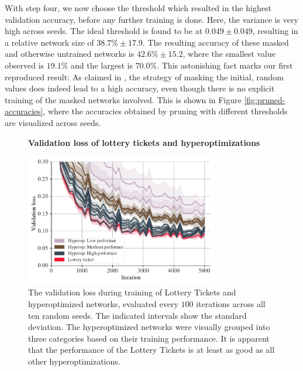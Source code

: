 \documentclass[12pt,final,twoside]{article}
\theoremstyle{plain}
\theoremstyle{definition}
\theoremstyle{remark}
\theoremstyle{named}
\begin{document}
With step four, we now choose the threshold which resulted in the highest validation accuracy, before any further training is done. Here, the variance is very high across seeds. The ideal threshold is found to be at $0.049 \pm 0.049$, resulting in a relative network size of $38.7\% \pm 17.9$. The resulting accuracy of these masked and otherwise untrained networks is $42.6\% \pm 15.2$, where the smallest value observed is $19.1\%$ and the largest is $70.0\%$. This astonishing fact marks our first reproduced result: As claimed in \cite{supermask}, the strategy of masking the initial, random values does indeed lead to a high accuracy, even though there is no explicit training of the masked networks involved. This is shown in Figure \ref{fig:pruned-accuracies}, where the accuracies obtained by pruning with different thresholds are visualized across seeds.

\begin{figure}[t]
  \centering
  \textbf{Validation loss of lottery tickets and hyperoptimizations}\par\medskip
  \includegraphics[width=0.75\textwidth]{plots/lt-loss.pdf}
  \caption{The validation loss during training of Lottery Tickets and hyperoptimized networks, evaluated every $100$ iterations across all ten random seeds. The indicated intervals show the standard deviation. The hyperoptimized networks were visually grouped into three categories based on their training performance. It is apparent that the performance of the Lottery Tickets is at least as good as all other hyperoptimizations.}
  \label{fig:lt-loss}
\end{figure}
\end{document}
